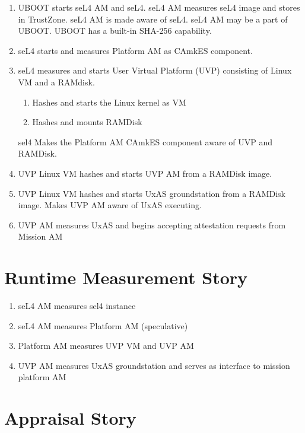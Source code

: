 \documentclass[11pt]{article}
\newcommand{\squash}{\parskip=0pt\itemsep=0pt}
\begin{document}
\begin{enumerate}
  \squash
\item UBOOT starts seL4 AM and seL4.  seL4 AM measures seL4 image and
  stores in TrustZone. seL4 AM is made aware of seL4. seL4 AM may be a
  part of UBOOT.  UBOOT has a built-in SHA-256 capability.
\item seL4 starts and measures Platform AM as CAmkES component.
\item seL4 measures and starts User Virtual Platform (UVP) consisting
  of Linux VM and a RAMdisk.

  \begin{enumerate}
    \squash
  \item Hashes and starts the Linux kernel as VM
  \item Hashes and mounts RAMDisk
  \end{enumerate}
  
  sel4 Makes the Platform AM CAmkES component aware of UVP and
  RAMDisk.

\item UVP Linux VM hashes and starts UVP AM from a RAMDisk image.
\item UVP Linux VM hashes and starts UxAS groundstation from a RAMDisk
  image.  Makes UVP AM aware of UxAS executing.
\item UVP AM measures UxAS and begins accepting attestation requests
  from Mission AM
\end{enumerate}

\section{Runtime Measurement Story}

\begin{enumerate}
\item seL4 AM measures sel4 instance
\item seL4 AM measures Platform AM (speculative)
\item Platform AM measures UVP VM and UVP AM
\item UVP AM measures UxAS groundstation and serves as interface to
  mission platform AM 
\end{enumerate}

\section{Appraisal Story}
\end{document}
